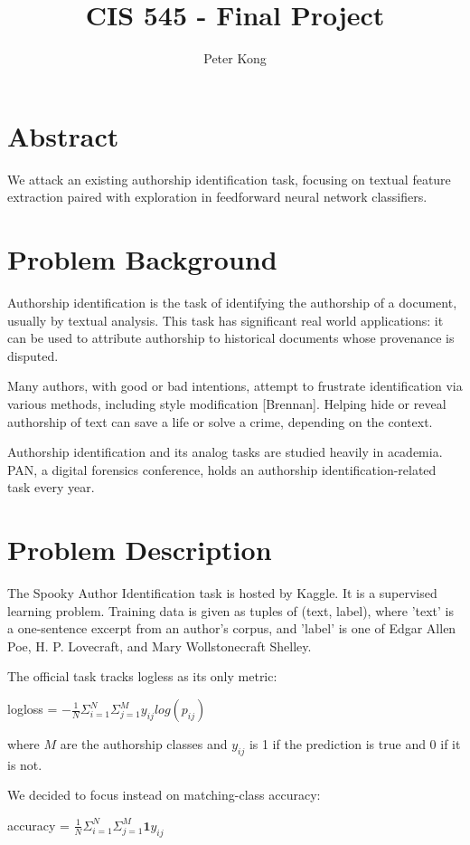 \documentclass[12pt]{article}
\title{CIS 545 - Final Project}
\author{Peter Kong}
\begin{document}
\maketitle



\hrulefill

\section{Abstract} We attack an existing authorship identification task, focusing on textual feature extraction paired with exploration in feedforward neural network classifiers.

\section{Problem Background}
Authorship identification is the task of identifying the authorship of a document, usually by textual analysis. This task has significant real world applications: it can be used to attribute authorship to historical documents whose provenance is disputed.

Many authors, with good or bad intentions, attempt to frustrate identification via various methods, including style modification [Brennan]. Helping hide or reveal authorship of text can save a life or solve a crime, depending on the context.

Authorship identification and its analog tasks are studied heavily in academia. PAN, a digital forensics conference, holds an authorship identification-related task every year. 


\section{Problem Description}
The Spooky Author Identification task is hosted by Kaggle. It is a supervised learning problem. Training data is given as tuples of (text, label), where 'text' is a one-sentence excerpt from an author's corpus, and 'label' is one of Edgar Allen Poe, H. P. Lovecraft, and Mary Wollstonecraft Shelley.

The official task tracks logless as its only metric:
\vskip 0.3in
\centerline{logloss = $-\frac{1}{N}\Sigma^N_{i=1}\Sigma^M_{j=1}y_{ij}log(p_{ij})$} 

where $M$ are the authorship classes and $y_{ij}$ is 1 if the prediction is true and 0 if it is not.

We decided to focus instead on matching-class accuracy: 
\vskip 0.3in
\centerline{accuracy = $\frac{1}{N}\Sigma^N_{i=1}\Sigma^M_{j=1}\textbf{1}y_{ij}$}
\end{document}
